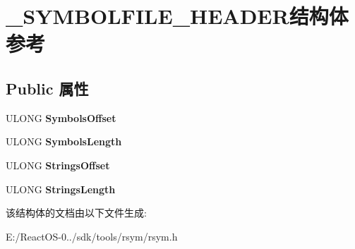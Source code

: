 \hypertarget{struct___s_y_m_b_o_l_f_i_l_e___h_e_a_d_e_r}{}\section{\+\_\+\+S\+Y\+M\+B\+O\+L\+F\+I\+L\+E\+\_\+\+H\+E\+A\+D\+E\+R结构体 参考}
\label{struct___s_y_m_b_o_l_f_i_l_e___h_e_a_d_e_r}
\subsection*{Public 属性}
\begin{DoxyCompactItemize}
\item 
\mbox{\label{struct___s_y_m_b_o_l_f_i_l_e___h_e_a_d_e_r_abdbd1744298e7bf082026efb7f8bba90}} 
U\+L\+O\+NG {\bfseries Symbols\+Offset}
\item 
\mbox{\label{struct___s_y_m_b_o_l_f_i_l_e___h_e_a_d_e_r_ac2c851df8cc0aa0cdc3fa81c5c3e63e0}} 
U\+L\+O\+NG {\bfseries Symbols\+Length}
\item 
\mbox{\label{struct___s_y_m_b_o_l_f_i_l_e___h_e_a_d_e_r_a4fc22dc3366798e2539aa3620815fef6}} 
U\+L\+O\+NG {\bfseries Strings\+Offset}
\item 
\mbox{\label{struct___s_y_m_b_o_l_f_i_l_e___h_e_a_d_e_r_a7ede9aee54b0c1f7d7ac8e33a4cbff9d}} 
U\+L\+O\+NG {\bfseries Strings\+Length}
\end{DoxyCompactItemize}


该结构体的文档由以下文件生成\+:\begin{DoxyCompactItemize}
\item 
E\+:/\+React\+O\+S-\/0../sdk/tools/rsym/rsym.\+h\end{DoxyCompactItemize}
